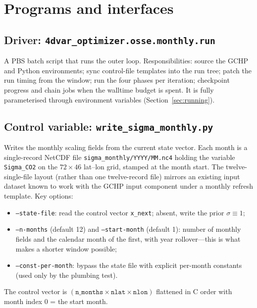 \documentclass[11pt]{article}
\newcommand{\code}[1]{\texttt{#1}}
\begin{document}
\section{Programs and interfaces}

\subsection{Driver: \code{4dvar\_optimizer.osse.monthly.run}}

A PBS batch script that runs the outer loop. Responsibilities: source the GCHP
and Python environments; sync control-file templates into the run tree; patch the
run timing from the window; run the four phases per iteration; checkpoint progress
and chain jobs when the walltime budget is spent. It is fully parameterised
through environment variables (Section~\ref{sec:running}).

\subsection{Control variable: \code{write\_sigma\_monthly.py}}

Writes the monthly scaling fields from the current state vector. Each month is a
single-record NetCDF file \code{sigma\_monthly/YYYY/MM.nc4} holding the variable
\code{Sigma\_CO2} on the $72\times46$ lat--lon grid, stamped at the month start.
The twelve-single-file layout (rather than one twelve-record file) mirrors an
existing input dataset known to work with the GCHP input component under a
monthly refresh template. Key options:
\begin{itemize}[nosep]
  \item \code{--state-file}: read the control vector \code{x\_next}; absent, write
        the prior $\sigma\equiv1$;
  \item \code{--n-months} (default 12) and \code{--start-month} (default 1):
        number of monthly fields and the calendar month of the first, with year
        rollover---this is what makes a shorter window possible;
  \item \code{--const-per-month}: bypass the state file with explicit per-month
        constants (used only by the plumbing test).
\end{itemize}
The control vector is $(\code{n\_months}\times\code{nlat}\times\code{nlon})$
flattened in C order with month index $0$ = the start month.
\end{document}
